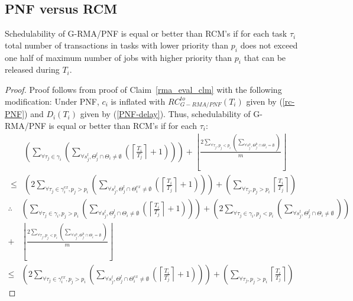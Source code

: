 \subsection{PNF versus RCM}\label{pnf vs rcm sec}
%
\begin{clm}\label{clm_pnf_rcm_comp}
%
Schedulability of G-RMA/PNF is equal or better than RCM's if for each task $\tau_i$ total number of transactions in tasks with lower priority than $p_i$ does not exceed one half of maximum number of jobs with higher priority than $p_{i}$ that can be released during $T_{i}$.
%
\end{clm}
%
\begin{proof}\normalfont
%
Proof follows from proof of Claim~\ref{rma_eval_clm} with the following modification: Under PNF, $c_i$ is inflated with $RC_{G-RMA/PNF}^{to}(T_i)$ given by (\ref{rc-PNF}) and $D_i(T_i)$ given by (\ref{PNF-delay}). Thus, schedulability of G-RMA/PNF is equal or better than RCM's if for each $\tau_i$:
%
\begin{eqnarray}
 & \left(\sum_{\forall\tau_{j}\in\gamma_{i}}\left(\sum_{\forall s_{j}^{l},\Theta_{j}^{l}\cap\Theta_{i}\neq\emptyset}\left(\left\lceil \frac{T_{i}}{T_{j}}\right\rceil +1\right)\right)\right)+\left\lfloor \frac{2\sum_{\forall\tau_{j},p_{j}<p_{i}}\left(\sum_{\forall s_{j}^{h},\Theta_{j}^{h}\cap\Theta_{i}=\emptyset}\right)}{m}\right\rfloor \nonumber \\
\le & \left(2\sum_{\forall\tau_{j}\in\gamma_{i}^{ex},p_{j}>p_{i}}\left(\sum_{\forall s_{j}^{l},\Theta_{j}^{l}\cap\Theta_{i}^{ex}\neq\emptyset}\left(\left\lceil \frac{T_{i}}{T_{j}}\right\rceil +1\right)\right)\right)+\left(\sum_{\forall\tau_{j},p_{j}>p_{i}}\left\lceil \frac{T_{i}}{T_{j}}\right\rceil \right)\label{eq:pnf_vs_rcm_2}
\end{eqnarray}
%
\begin{eqnarray}
\therefore & \left(\sum_{\forall\tau_{j}\in\gamma_{i},p_{j}>p_{i}}\left(\sum_{\forall s_{j}^{l},\Theta_{j}^{l}\cap\Theta_{i}\neq\emptyset}\left(\left\lceil \frac{T_{i}}{T_{j}}\right\rceil +1\right)\right)\right)+\left(2\sum_{\forall\tau_{j}\in\gamma_{i},p_{j}<p_{i}}\left(\sum_{\forall s_{j}^{l},\Theta_{j}^{l}\cap\Theta_{i}\neq\emptyset}\right)\right) \nonumber\\
+ & \left\lfloor \frac{2\sum_{\forall\tau_{j},p_{j}<p_{i}}\left(\sum_{\forall s_{j}^{h},\Theta_{j}^{h}\cap\Theta_{i}=\emptyset}\right)}{m}\right\rfloor \nonumber \\
\le & \left(2\sum_{\forall\tau_{j}\in\gamma_{i}^{ex},p_{j}>p_{i}}\left(\sum_{\forall s_{j}^{l},\Theta_{j}^{l}\cap\Theta_{i}^{ex}\neq\emptyset}\left(\left\lceil \frac{T_{i}}{T_{j}}\right\rceil +1\right)\right)\right)+\left(\sum_{\forall\tau_{j},p_{j}>p_{i}}\left\lceil \frac{T_{i}}{T_{j}}\right\rceil \right)\label{eq:pnf_vs_rcm_3}

\end{eqnarray}
\end{proof}
